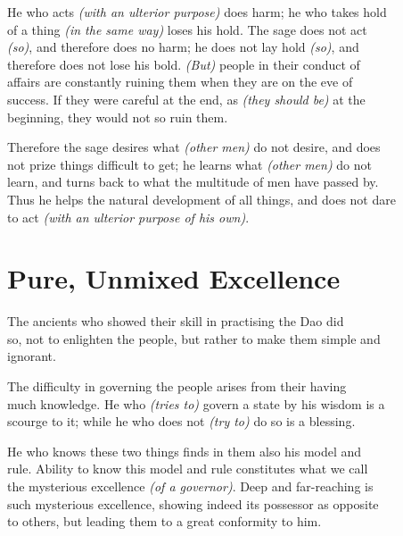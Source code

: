    He who acts \textit{(with an ulterior purpose)} does harm; he who takes hold\\
    of a thing \textit{(in the same way)} loses his hold. The sage does not act\\
    \textit{(so)}, and therefore does no harm; he does not lay hold \textit{(so)}, and\\
    therefore does not lose his bold. \textit{(But)} people in their conduct of\\
    affairs are constantly ruining them when they are on the eve of\\
    success. If they were careful at the end, as \textit{(they should be)} at the\\
    beginning, they would not so ruin them.\vspace{\baselineskip}
    
    Therefore the sage desires what \textit{(other men)} do not desire, and does\\
    not prize things difficult to get; he learns what \textit{(other men)} do not\\
    learn, and turns back to what the multitude of men have passed by.\\
    Thus he helps the natural development of all things, and does not dare\\
    to act \textit{(with an ulterior purpose of his own)}.\vspace{\baselineskip}
  \newpage{} 
\section*{Pure, Unmixed Excellence}
    The ancients who showed their skill in practising the Dao did\\
    so, not to enlighten the people, but rather to make them simple and\\
    ignorant.\vspace{\baselineskip}
    
    The difficulty in governing the people arises from their having\\
    much knowledge. He who \textit{(tries to)} govern a state by his wisdom is a\\
    scourge to it; while he who does not \textit{(try to)} do so is a blessing.\vspace{\baselineskip}
    
    He who knows these two things finds in them also his model and\\
    rule. Ability to know this model and rule constitutes what we call\\
    the mysterious excellence \textit{(of a governor)}. Deep and far-reaching is\\
    such mysterious excellence, showing indeed its possessor as opposite\\
    to others, but leading them to a great conformity to him.\vspace{\baselineskip}

